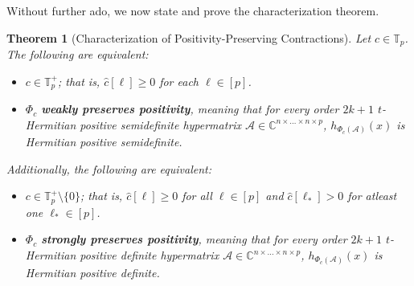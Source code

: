 \documentclass[11pt]{article}
\newtheorem{theorem}{Theorem}[section]
\begin{document}
Without further ado, we now state and prove the characterization theorem. 
\begin{theorem}[Characterization of Positivity-Preserving Contractions]
    Let $c\in \mathbb{T}_p$. The following are equivalent:
    \begin{itemize}
        \item[(i)] $c\in \mathbb{T}_p^+$; that is, $\widehat{c}[\ell]\geq 0$ for each $\ell\in [p]$. 
        \item[(ii)] $\Phi_c$ \textbf{weakly preserves positivity}, meaning that for every order $2k+1$ $t$-Hermitian positive semidefinite hypermatrix $\mathcal{A}\in \mathbb{C}^{n\times\dots\times n\times p}$, $h_{\Phi_c(\mathcal{A})}(x)$ is Hermitian positive semidefinite. 
    \end{itemize}
    Additionally, the following are equivalent:
    \begin{itemize}
        \item[(a)] $c\in \mathbb{T}_p^+\setminus \{0\}$; that is, $\widehat{c}[\ell]\geq 0$ for all $\ell\in [p]$ and $\widehat{c}[\ell_*] > 0$ for atleast one $\ell_*\in [p]$. 
        \item[(b)] $\Phi_c$ \textbf{strongly preserves positivity}, meaning that for every order $2k+1$ $t$-Hermitian positive definite hypermatrix $\mathcal{A}\in \mathbb{C}^{n\times\dots\times n\times p}$, $h_{\Phi_c(\mathcal{A})}(x)$ is Hermitian positive definite. 
    \end{itemize}
\end{theorem}
\end{document}
